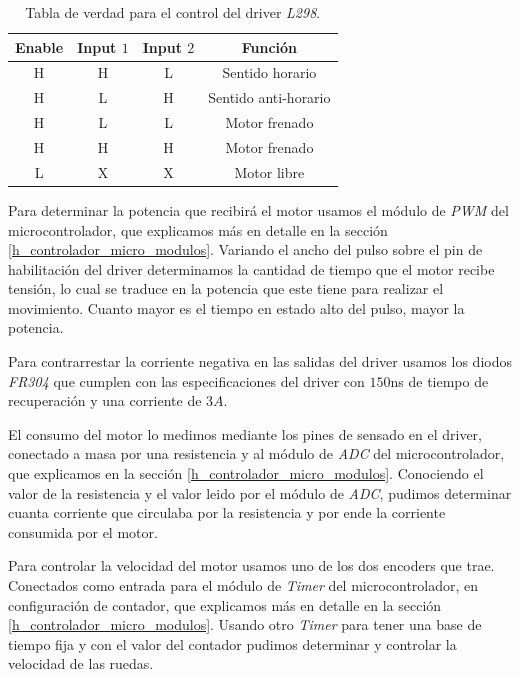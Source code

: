 \begin{table}
	\begin{center}
		\begin{tabular}{|c|c|c|c|}
			\hline
			Enable & Input $1$ & Input $2$ & Funci\'on \\
			\hline
			H & H & L & Sentido horario \\
			H & L & H & Sentido anti-horario \\
			H & L & L & Motor frenado \\
			H & H & H & Motor frenado \\
			L & X & X & Motor libre \\
			\hline
		\end{tabular}
	\end{center}
	\caption{Tabla de verdad para el control del driver \emph{L298}.}
	\label{hT_l298}
\end{table}

Para determinar la potencia que recibir\'a el motor usamos el m\'odulo de \emph{PWM} del microcontrolador, que explicamos m\'as en detalle en la
secci\'on \ref{h_controlador_micro_modulos}.
Variando el ancho del pulso sobre el pin de habilitaci\'on del driver determinamos la cantidad de tiempo que el motor recibe tensi\'on, lo cual
se traduce en la potencia que este tiene para realizar el movimiento.
Cuanto mayor es el tiempo en estado alto del pulso, mayor la potencia.

Para contrarrestar la corriente negativa en las salidas del driver usamos los diodos \emph{FR304} que cumplen con las especificaciones del driver
con $150$ns de tiempo de recuperaci\'on y una corriente de $3 A$.

El consumo del motor lo medimos mediante los pines de sensado en el driver, conectado a masa por una resistencia y al m\'odulo de \emph{ADC} del
microcontrolador, que explicamos en la secci\'on \ref{h_controlador_micro_modulos}.
Conociendo el valor de la resistencia y el valor leido por el m\'odulo de \emph{ADC}, pudimos determinar cuanta corriente que circulaba por la
resistencia y por ende la corriente consumida por el motor.

Para controlar la velocidad del motor usamos uno de los dos encoders que trae.
Conectados como entrada para el m\'odulo de \emph{Timer} del microcontrolador, en configuraci\'on de contador, que explicamos m\'as en detalle en la
secci\'on \ref{h_controlador_micro_modulos}.
Usando otro \emph{Timer} para tener una base de tiempo fija y con el valor del contador pudimos determinar y controlar la velocidad de las ruedas.

